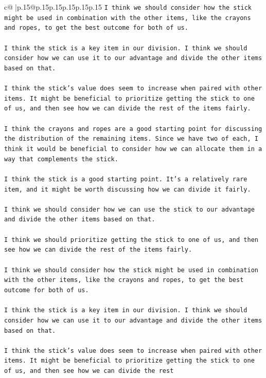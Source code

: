 \documentclass{article}
\begin{document}
{\begin{supertabular}{c@{$\;$}|p{.15\linewidth}@{}p{.15\linewidth}p{.15\linewidth}p{.15\linewidth}p{.15\linewidth}p{.15\linewidth}}
{{{\texttt{I think we should consider how the stick might be used in combination with the other items, like the crayons and ropes, to get the best outcome for both of us.} \\
\\ 
\texttt{I think the stick is a key item in our division. I think we should consider how we can use it to our advantage and divide the other items based on that.} \\
\\ 
\texttt{I think the stick's value does seem to increase when paired with other items. It might be beneficial to prioritize getting the stick to one of us, and then see how we can divide the rest of the items fairly.} \\
\\ 
\texttt{I think the crayons and ropes are a good starting point for discussing the distribution of the remaining items. Since we have two of each, I think it would be beneficial to consider how we can allocate them in a way that complements the stick.} \\
\\ 
\texttt{I think the stick is a good starting point. It's a relatively rare item, and it might be worth discussing how we can divide it fairly.} \\
\\ 
\texttt{I think we should consider how we can use the stick to our advantage and divide the other items based on that.} \\
\\ 
\texttt{I think we should prioritize getting the stick to one of us, and then see how we can divide the rest of the items fairly.} \\
\\ 
\texttt{I think we should consider how the stick might be used in combination with the other items, like the crayons and ropes, to get the best outcome for both of us.} \\
\\ 
\texttt{I think the stick is a key item in our division. I think we should consider how we can use it to our advantage and divide the other items based on that.} \\
\\ 
\texttt{I think the stick's value does seem to increase when paired with other items. It might be beneficial to prioritize getting the stick to one of us, and then see how we can divide the rest} \\
            }
        }
    }
     \\ \\


\end{supertabular}}
\end{document}

